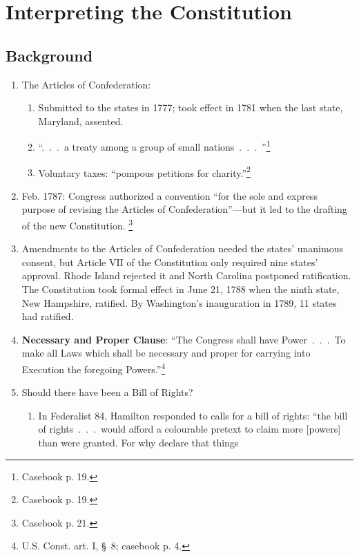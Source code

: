 \section{Interpreting the Constitution}

\subsection{Background}

\begin{enumerate}
    \item The Articles of Confederation:
    \begin{enumerate}
        \item Submitted to the states in 1777; took effect in 1781 when the 
        last state, Maryland, assented.
        \item ``.~.~.~a treaty among a group of small nations~.~.~.~''\footnote{Casebook p. 
        19.}
        \item Voluntary taxes: ``pompous petitions for 
        charity.''\footnote{Casebook p. 19.}
    \end{enumerate}
    \item Feb. 1787: Congress authorized a convention ``for the sole and 
    express purpose of revising the Articles of 
    Confederation''---but it led to the drafting of the new Constitution. 
    \footnote{Casebook p. 21.}
    \item Amendments to the Articles of Confederation needed the states' 
    unanimous consent, but Article VII of the Constitution only required nine 
    states' approval. Rhode Island rejected it and North Carolina postponed 
    ratification. The Constitution took formal effect in June 21, 1788 when 
    the ninth state, New Hampshire, ratified. By Washington's inauguration in 
    1789, 11 states had ratified.
    \item \textbf{Necessary and Proper Clause}: ``The Congress shall have 
    Power~.~.~.~To make all Laws which shall be necessary and proper for carrying 
    into Execution the foregoing Powers.''\footnote{U.S. Const. art. I, \S\ 8; 
    casebook p. 4.}
    \item Should there have been a Bill of Rights?
    \begin{enumerate}
        \item In Federalist 84, Hamilton responded to calls for a bill of 
        rights: ``the bill of rights~.~.~.~would afford a colourable pretext 
        to claim more [powers] than were granted. For why declare that things 

\end{enumerate}
\end{enumerate}
